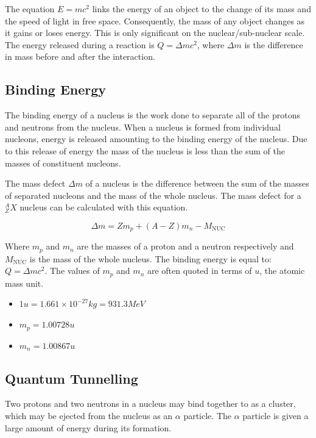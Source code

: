\documentclass[12pt]{article}
\begin{document}
The equation \(E = mc^2\) links the energy of an object to the change of its mass and the speed of light in free space. Consequently, the mass of any object changes as it gains or loses energy. This is only significant on the nuclear/sub-nuclear scale. The energy released during a reaction is \(Q = \Delta mc^2\), where \(\Delta m\) is the difference in mass before and after the interaction.

\subsection{Binding Energy}
\label{sec:org9c0af8c}

The binding energy of a nucleus is the work done to separate all of the protons and neutrons from the nucleus. When a nucleus is formed from individual nucleons, energy is released amounting to the binding energy of the nucleus. Due to this release of energy the mass of the nucleus is less than the sum of the masses of constituent nucleons.

The mass defect \(\Delta m\) of a nucleus is the difference between the sum of the masses of separated nucleons and the mass of the whole nucleus. The mass defect for a \(^A_ZX\) nucleus can be calculated with this equation.

\[\Delta m =  Zm_p + (A-Z)m_n - M_{\text{NUC}} \]

Where \(m_p\) and \(m_n\) are the masses of a proton and a neutron respectively and \(M_{\text{NUC}}\) is the mass of the whole nucleus. The binding energy is equal to: \(Q = \Delta mc^2\). The values of \(m_p\) and \(m_n\) are often quoted in terms of \(u\), the atomic mass unit.

\begin{itemize}
\item \(1u = 1.661 \times 10^{-27}kg= 931.3MeV\)
\item \(m_p = 1.00728u\)
\item \(m_n = 1.00867u\)
\end{itemize}

\subsection{Quantum Tunnelling}
\label{sec:org2437333}

Two protons and two neutrons in a nucleus may bind together to as a cluster, which may be ejected from the nucleus as an \(\alpha\) particle. The \(\alpha\) particle is given a large amount of energy during its formation.
\end{document}
